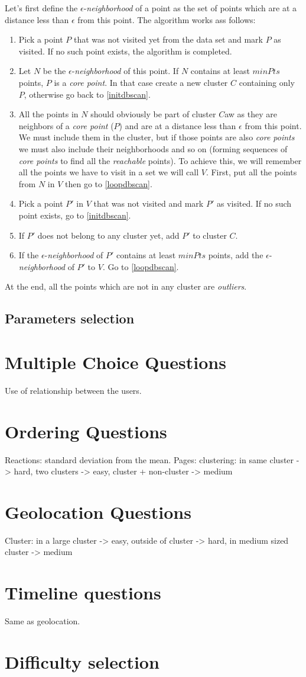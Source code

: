 Let's first define the $\epsilon$-\emph{neighborhood} of a point as the set of points which are at a distance less than $\epsilon$ from this point. The algorithm works ass follows\cite{dbscan}:
\begin{enumerate}
	\item \label{initdbscan} Pick a point $P$ that was not visited yet from the data set and mark $P$ as visited. If no such point exists, the algorithm is completed.
	\item Let $N$ be the $\epsilon$-\emph{neighborhood} of this point. If $N$ contains at least $minPts$ points, $P$ is a \emph{core point}. In that case create a new cluster $C$ containing only $P$, otherwise go back to \ref{initdbscan}.
	\item All the points in $N$ should obviously be part of cluster $C$aw as they are neighbors of a \emph{core point} ($P$) and are at a distance less than $\epsilon$ from this point. We must include them in the cluster, but if those points are also \emph{core points} we must also include their neighborhoods and so on (forming sequences of \emph{core points} to find all the \emph{reachable} points). To achieve this, we will remember all the points we have to visit in a set we will call $V$. First, put all the points from $N$ in $V$ then go to \ref{loopdbscan}.
	\item \label{loopdbscan} Pick a point $P'$ in $V$ that was not visited and mark $P'$ as visited. If no such point exists, go to \ref{initdbscan}.
	\item If $P'$ does not belong to any cluster yet, add $P'$ to cluster $C$.
	\item If the $\epsilon$-\emph{neighborhood} of $P'$ contains at least $minPts$ points, add the $\epsilon$-\emph{neighborhood} of $P'$ to $V$. Go to \ref{loopdbscan}.
\end{enumerate}

At the end, all the points which are not in any cluster are \emph{outliers}.

\subsection{Parameters selection}

\section{Multiple Choice Questions}
Use of relationship between the users.
\section{Ordering Questions}
Reactions: standard deviation from the mean.
Pages: clustering: in same cluster -> hard, two clusters -> easy, cluster + non-cluster -> medium
\section{Geolocation Questions}
Cluster: in a large cluster -> easy, outside of cluster -> hard, in medium sized cluster -> medium
\section{Timeline questions}
Same as geolocation.
\section{Difficulty selection}